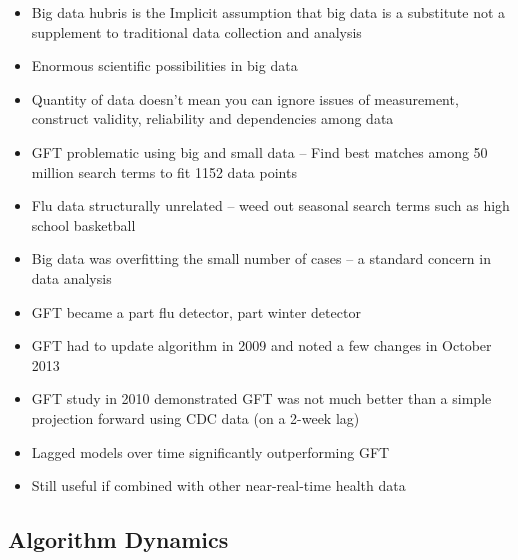 \documentclass[
]{book}
\providecommand{\tightlist}{%
  \setlength{\itemsep}{0pt}\setlength{\parskip}{0pt}}
\begin{document}
\begin{itemize}
\tightlist
\item
  Big data hubris is the Implicit assumption that big data is a substitute not a supplement to traditional data collection and analysis
\item
  Enormous scientific possibilities in big data
\item
  Quantity of data doesn't mean you can ignore issues of measurement, construct validity, reliability and dependencies among data
\item
  GFT problematic using big and small data -- Find best matches among 50 million search terms to fit 1152 data points
\item
  Flu data structurally unrelated -- weed out seasonal search terms such as high school basketball
\item
  Big data was overfitting the small number of cases -- a standard concern in data analysis
\item
  GFT became a part flu detector, part winter detector
\item
  GFT had to update algorithm in 2009 and noted a few changes in October 2013
\item
  GFT study in 2010 demonstrated GFT was not much better than a simple projection forward using CDC data (on a 2-week lag)
\item
  Lagged models over time significantly outperforming GFT
\item
  Still useful if combined with other near-real-time health data
\end{itemize}

\subsection{Algorithm Dynamics}\label{algorithm-dynamics}
\end{document}
